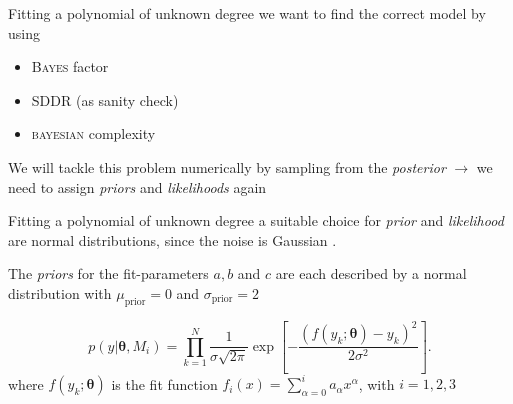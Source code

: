\documentclass[11pt,aspectratio=1610,dvipsnames]{beamer}
\newcommand{\btheta}{\boldsymbol{\theta}}
\begin{document}
\begin{frame}{Fitting a polynomial of unknown degree}
	we want to find the correct model by using
	
	\begin{itemize}
		\item \textsc{Bayes} factor 
		\item SDDR (as sanity check)
		\item \textsc{bayesian} complexity
	\end{itemize}
	We will tackle this problem numerically by sampling from the \emph{posterior} $\to$ we need to assign \emph{priors} and \emph{likelihoods} again
\end{frame}

\begin{frame}{Fitting a polynomial of unknown degree}
	a suitable choice for \emph{prior} and \emph{likelihood} are normal distributions, since the noise is Gaussian \citet{sivia}.
		\begin{tcolorbox}[colback=black!5,colframe=gray!15!black,title=Choosing a prior]
		The \emph{priors} for the fit-parameters $a,b$ and $c$  are each described by a normal distribution with $\mu_{\text{prior}}=0$ and $\sigma_{\text{prior}}=2$
	\end{tcolorbox}

		\begin{tcolorbox}[colback=black!5,colframe=gray!15!black,title=Choosing a likelihood]
			$$p(y|\btheta, M_i)=\prod_{k=1}^{N}\frac{1}{\sigma\sqrt{2\pi}}\exp{\left[-\frac{(f(y_k;\btheta)-y_k)^2}{2\sigma^2}\right]}.$$
			where $f(y_k;\btheta)$ is the fit function $f_i(x)=\displaystyle\sum_{\alpha=0}^{i}a_\alpha x^\alpha$, with $i=1,2,3$
	\end{tcolorbox}
\end{frame}
\end{document}
